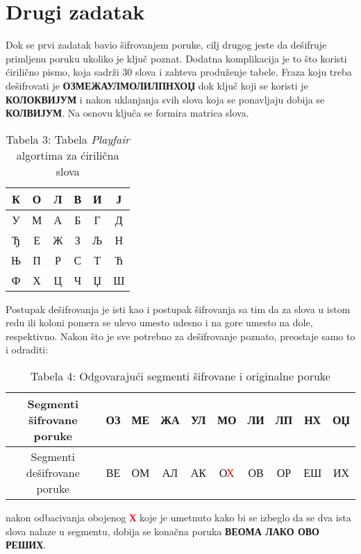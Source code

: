 \documentclass[12pt]{article}
\begin{document}
\section{Drugi zadatak}
\par Dok se prvi zadatak bavio šifrovanjem poruke, cilj drugog jeste da
dešifruje primljenu poruku ukoliko je ključ poznat.
Dodatna komplikacija je to što koristi ćirilično pismo, koja sadrži 30 slova i
zahteva produženje tabele.
Fraza koju treba dešifrovati je \textbf{ОЗМЕЖАУЛМОЛИЛПНХОЏ} dok ključ
koji se koristi je \textbf{КОЛОКВИЈУМ} i nakon uklanjanja svih slova koja
se ponavljaju dobija se \textbf{КОЛВИЈУМ}.
Na osnovu ključa se formira matrica slova.
\begin{center}
\begin{table}[h]
	\centering
    \begin{tabular}{|c|c|c|c|c|c|}
        \hline
		К & О & Л & В & И & Ј \\
		\hline
		У & М & А & Б & Г & Д \\
		\hline
		Ђ & Е & Ж & З & Љ & Н \\
		\hline
		Њ & П & Р & С & Т & Ћ \\
		\hline
		Ф & Х & Ц & Ч & Џ & Ш \\
		\hline
    \end{tabular}
	\caption*{Tabela 3: Tabela \textit{Playfair} algortima za ćirilična slova}
\end{table}
\end{center}
Postupak dešifrovanja je isti kao i postupak šifrovanja sa tim da za slova
u istom redu ili koloni pomera se ulevo umesto udesno i na gore umesto na dole,
respektivno.
Nakon što je sve potrebno za dešifrovanje poznato, preostaje samo to i odraditi:
\begin{center}
\begin{table}[ht]
	\centering
	\begin{tabular}{|c|c|c|c|c|c|c|c|c|c|}
		\hline
		Segmenti šifrovane poruke & ОЗ & МЕ & ЖА & УЛ & МО & ЛИ & ЛП & НХ & ОЏ \\
		\hline
		Segmenti dešifrovane poruke & ВЕ & ОМ & АЛ & АК & О\textcolor{red}{Х}
									& ОВ & ОР & ЕШ & ИХ \\
		\hline
	\end{tabular}
	\caption*{Tabela 4: Odgovarajući segmenti šifrovane i originalne poruke}
\end{table}
\end{center}
nakon odbacivanja obojenog \textcolor{red}{\textbf{Х}} koje je umetnuto kako bi
se izbeglo da se dva ista slova nalaze u segmentu, dobija se konačna poruka
\textbf{ВЕОМА ЛАКО ОВО РЕШИХ}.
\end{document}
